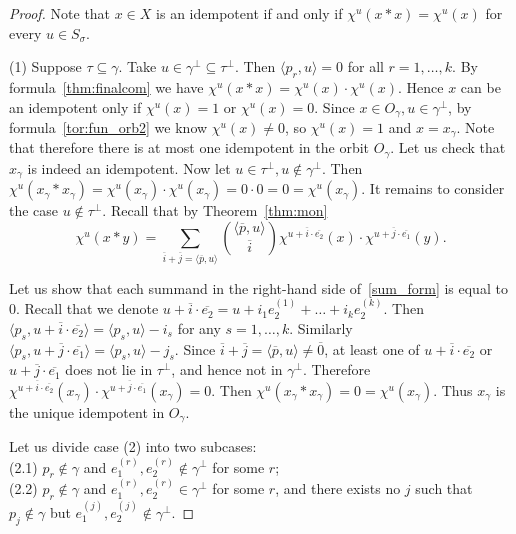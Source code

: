 \documentclass[10pt,a4paper]{amsart}
\newcommand{\ol}[1]{\overline{#1}}
\begin{document}
\begin{proof}
	Note that $x \in X$ is an idempotent if and only if $\chi^u(x * x) = \chi^u(x)$ for every $u \in S_\sigma$.
	
	\bigskip
	
	(1) Suppose $\tau \subseteq \gamma$. Take $u \in \gamma^\perp \subseteq \tau^\perp$. Then $\langle p_r, u\rangle = 0$ for all $r = 1, \ldots, k$. By formula~\eqref{thm:finalcom} we have $\chi^u(x*x) = \chi^u(x)\cdot\chi^u(x)$. Hence $x$ can be an idempotent only if $\chi^u(x) = 1$ or $\chi^u(x) = 0$. Since $x \in O_\gamma, u \in \gamma^\perp$, by formula~\eqref{tor:fun_orb2} we know $\chi^u(x) \neq 0$, so $\chi^u(x) = 1$ and $x = x_\gamma$. Note that therefore there is at most one idempotent in the orbit $O_\gamma$. Let us check that $x_\gamma$ is indeed an idempotent. Now let $u \in \tau^\perp, u \notin \gamma^\perp$. Then $\chi^u(x_\gamma*x_\gamma) = \chi^u(x_\gamma)\cdot \chi^u(x_\gamma) = 0 \cdot 0 = 0 = \chi^u(x_\gamma)$. It remains to consider the case $u \notin \tau^\perp$. Recall that by Theorem~\ref{thm:mon}
	\begin{equation}\label{sum_form}
		\chi^u (x * y) = \sum \limits_{\ol{i} + \ol{j} = \langle \ol{p}, u \rangle } { \langle \ol{p}, u \rangle \choose \ol{i} } \chi^{u + \ol{i}\cdot \ol{e_2}}(x) \cdot  \chi^{u + \ol{j}\cdot \ol{e_1}} (y).
	\end{equation}
	
	Let us show that each summand in the right-hand side of~\eqref{sum_form} is equal to $0$. Recall that we denote $u + \ol{i}\cdot \ol{e_2} = u + i_1 e_2^{(1)} + \ldots + i_k e_2^{(k)}$. Then $\langle p_s, u + \ol{i}\cdot \ol{e_2} \rangle = \langle p_s, u\rangle - i_s$ for any $s = 1, \ldots, k$. Similarly $\langle p_s, u + \ol{j}\cdot \ol{e_1} \rangle = \langle p_s, u\rangle - j_s$. Since $\ol{i} + \ol{j} = \langle \ol{p}, u \rangle \neq \ol{0}$, at least one of $u + \ol{i}\cdot \ol{e_2}$ or $u + \ol{j}\cdot \ol{e_1}$ does not lie in $\tau^\perp$, and hence not in $\gamma^\perp$. Therefore $\chi^{u + \ol{i}\cdot \ol{e_2}}(x_\gamma) \cdot  \chi^{u + \ol{j}\cdot \ol{e_1}} (x_\gamma) = 0$. Then $\chi^u(x_\gamma*x_\gamma) = 0 = \chi^u(x_\gamma)$. Thus $x_\gamma$ is the unique idempotent in $O_\gamma$.
	
	\bigskip
	
	Let us divide case (2) into two subcases:\\
	(2.1) $p_r \notin \gamma$ and $e_1^{(r)}, e_2^{(r)} \notin \gamma^\perp$ for some $r$;\\
	(2.2) $p_r \notin \gamma$ and $e_1^{(r)}, e_2^{(r)} \in \gamma^\perp$ for some $r$, and there exists no $j$ such that $p_j \notin \gamma$ but ${e_1^{(j)}, e_2^{(j)} \notin \gamma^\perp}$.
	

\end{proof}
\end{document}
